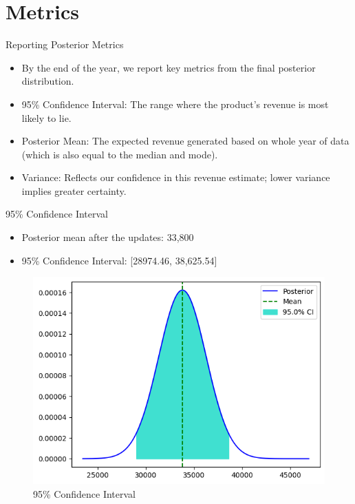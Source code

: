 \section{Metrics}

\begin{frame}{Reporting Posterior Metrics}

\begin{itemize}
  \item By the end of the year, we report key metrics from the final posterior distribution.
  \item 95\% Confidence Interval: The range where the product's revenue is most likely to lie.
  \item Posterior Mean: The expected revenue generated based on whole year of data (which is also equal to the median and mode).
  \item Variance: Reflects our confidence in this revenue estimate; lower variance implies greater certainty.
\end{itemize}

\end{frame}

\begin{frame}{95\% Confidence Interval}

\begin{itemize}
  \item Posterior mean after the updates: 33,800
  \item 95\% Confidence Interval: [28974.46, 38,625.54]
\end{itemize}

\begin{figure}
  \centering
  \includegraphics[width=.8\linewidth]{../Report/images/ci.png}
  \caption{95\% Confidence Interval}
\end{figure}
  
\end{frame}

